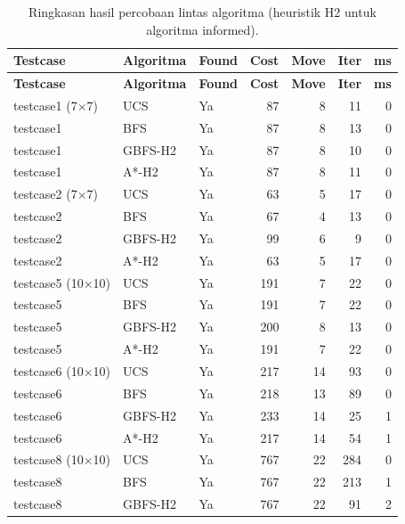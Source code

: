 \documentclass[11pt,a4paper]{article}
\begin{document}
\begin{longtable}{lllrrrr}
\caption{Ringkasan hasil percobaan lintas algoritma (heuristik H2 untuk algoritma informed).}\\
\toprule
\textbf{Testcase} & \textbf{Algoritma} & \textbf{Found} & \textbf{Cost} & \textbf{Move} & \textbf{Iter} & \textbf{ms} \\
\midrule
\endfirsthead
\toprule
\textbf{Testcase} & \textbf{Algoritma} & \textbf{Found} & \textbf{Cost} & \textbf{Move} & \textbf{Iter} & \textbf{ms} \\
\midrule
\endhead
testcase1 (7$\times$7)    & UCS     & Ya    &   87 &  8 &  11 & 0 \\
testcase1                 & BFS     & Ya    &   87 &  8 &  13 & 0 \\
testcase1                 & GBFS-H2 & Ya    &   87 &  8 &  10 & 0 \\
testcase1                 & A*-H2   & Ya    &   87 &  8 &  11 & 0 \\
\midrule
testcase2 (7$\times$7)    & UCS     & Ya    &   63 &  5 &  17 & 0 \\
testcase2                 & BFS     & Ya    &   67 &  4 &  13 & 0 \\
testcase2                 & GBFS-H2 & Ya    &   99 &  6 &   9 & 0 \\
testcase2                 & A*-H2   & Ya    &   63 &  5 &  17 & 0 \\
\midrule
testcase5 (10$\times$10)  & UCS     & Ya    &  191 &  7 &  22 & 0 \\
testcase5                 & BFS     & Ya    &  191 &  7 &  22 & 0 \\
testcase5                 & GBFS-H2 & Ya    &  200 &  8 &  13 & 0 \\
testcase5                 & A*-H2   & Ya    &  191 &  7 &  22 & 0 \\
\midrule
testcase6 (10$\times$10)  & UCS     & Ya    &  217 & 14 &  93 & 0 \\
testcase6                 & BFS     & Ya    &  218 & 13 &  89 & 0 \\
testcase6                 & GBFS-H2 & Ya    &  233 & 14 &  25 & 1 \\
testcase6                 & A*-H2   & Ya    &  217 & 14 &  54 & 1 \\
\midrule
testcase8 (10$\times$10)  & UCS     & Ya    &  767 & 22 & 284 & 0 \\
testcase8                 & BFS     & Ya    &  767 & 22 & 213 & 1 \\
testcase8                 & GBFS-H2 & Ya    &  767 & 22 &  91 & 2 \\

\end{longtable}
\end{document}
